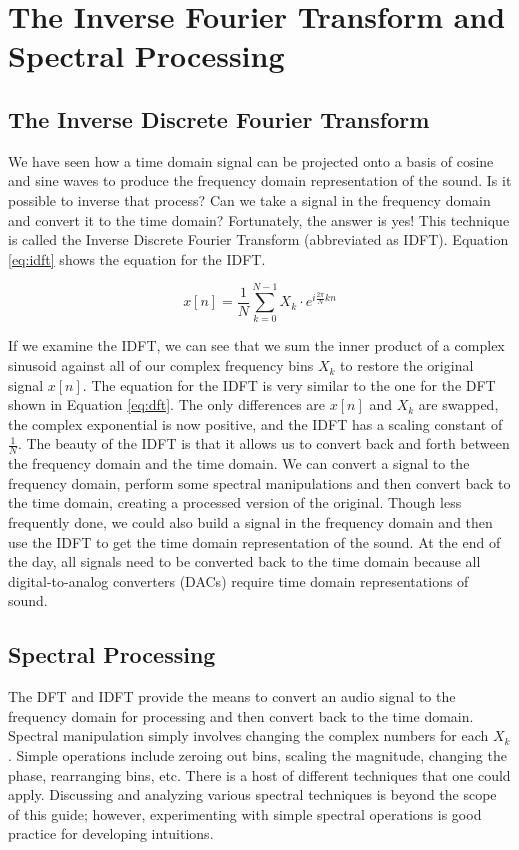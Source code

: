 \section*{The Inverse Fourier Transform and Spectral Processing}

\subsection*{The Inverse Discrete Fourier Transform}

We have seen how a time domain signal can be projected onto a basis of cosine and sine waves to produce the
frequency domain representation of the sound.  Is it possible to inverse that process?  Can we take a signal
in the frequency domain and convert it to the time domain?  Fortunately, the answer is yes!  This technique
is called the Inverse Discrete Fourier Transform (abbreviated as IDFT).  Equation \ref{eq:idft} shows the equation
for the IDFT.  

\begin{equation}
	\label{eq:idft}
	x[n] = \frac{1}{N}\sum_{k = 0}^{N - 1}X_k \cdot e^{i\frac{2\pi}{N}kn}
\end{equation}

If we examine the IDFT, we can see that we sum the inner product of a complex sinusoid against all of our 
complex frequency bins $X_k$ to restore the original signal $x[n]$.  The equation for the IDFT is very similar
to the one for the DFT shown in Equation \ref{eq:dft}.  The only differences are $x[n]$ and $X_k$ are swapped,
the complex exponential is now positive, and the IDFT has a scaling constant of $\frac{1}{N}$.  
The beauty of the IDFT is that it allows us
to convert back and forth between the frequency domain and the time domain.  We can convert a signal to the
frequency domain, perform some spectral manipulations and then convert back to the time domain, creating
a processed version of the original.  Though less frequently done, we could also build a signal in the frequency
domain and then use the IDFT to get the time domain representation of the sound.  At the end of the day, all 
signals need to be converted back to the time domain because all digital-to-analog converters (DACs) require
time domain representations of sound.

\subsection*{Spectral Processing}

The DFT and IDFT provide the means to convert an audio signal to the frequency domain for processing and
then convert back to the time domain.  Spectral manipulation simply involves changing the complex numbers for
each $X_k$.  Simple operations include zeroing out bins, scaling the magnitude, changing the phase, rearranging
bins, etc.  There is a host of different techniques that one could apply.  Discussing and analyzing various spectral 
techniques is beyond the scope of this guide; however, experimenting with simple spectral operations is good 
practice for developing intuitions.